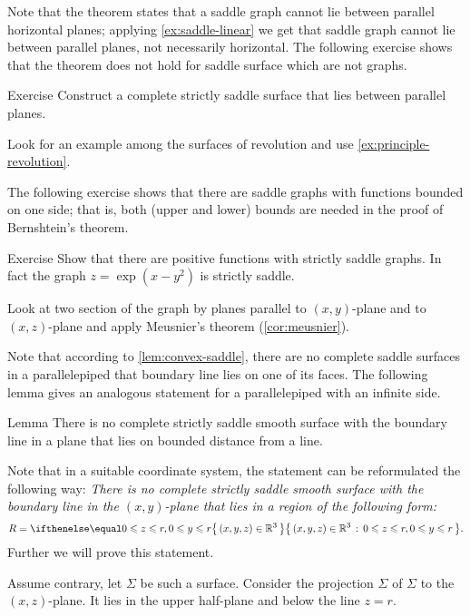 Note that the theorem states that a saddle graph cannot lie between parallel horizontal planes;
applying \ref{ex:saddle-linear} we get that saddle graph cannot lie between parallel planes,
not necessarily horizontal.
The following exercise shows that the theorem does not hold for saddle surface which are not graphs.


\begin{thm}{Exercise}\label{ex:between-parallels}
Construct a complete strictly saddle surface that lies between parallel planes.
\end{thm}

 Look for an example among the surfaces of revolution and use \ref{ex:principle-revolution}.


The following exercise shows that there are saddle graphs with functions bounded on one side; that is, both (upper and lower) bounds are needed in the proof of Bernshtein's theorem.

\begin{thm}{Exercise}\label{ex:one-side-bernshtein}
Show that there are positive functions with strictly saddle graphs.
In fact the graph
$z=\exp(x-y^2)$
is strictly saddle.
\end{thm}

 Look at two section of the graph by planes parallel to $(x,y)$-plane and to $(x,z)$-plane and apply Meusnier's theorem (\ref{cor:meusnier}).

Note that according to \ref{lem:convex-saddle}, there are no complete saddle surfaces in a parallelepiped that boundary line lies on one of its faces.
The following lemma gives an analogous statement for a parallelepiped with an infinite side.

\begin{thm}{Lemma}\label{lem:region}
There is no complete strictly saddle smooth surface 
with the boundary line in a plane
that lies on bounded distance from a line.
\end{thm}


Note that in a suitable coordinate system, the statement can be reformulated the following way:
\emph{There is no complete strictly saddle smooth surface 
with the boundary line in the $(x,y)$-plane
that lies in a region of the following form:}
\[R=\set{(x,y,z)\in\RR^3}{0\le z\le r, 0\le y\le r}.\]
Further we will prove this statement.

Assume contrary, let $\Sigma$ be such a surface.
Consider the projection $\hat \Sigma$ of $\Sigma$ to the $(x,z)$-plane.
It lies in the upper half-plane and below the line $z=r$.

